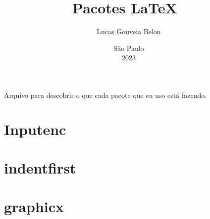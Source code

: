 \documentclass{article}
\begin{document}
\title{Pacotes \LaTeX\ }                %
\author{Lucas Gouveia Belon}            %
\date{\vspace{2.2cm}São Paulo\\2023}    %
\maketitle                              %

\tableofcontents                        %

Arquivo para descobrir o que cada pacote
que eu uso está fazendo.                

\section*{Inputenc}
\section*{indentfirst}
\section*{graphicx}
\end{document}
